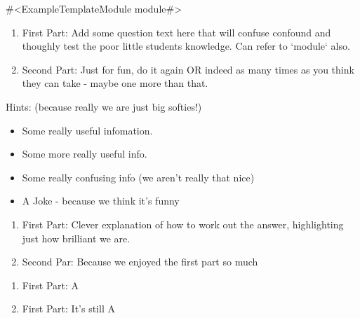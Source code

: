 

#<ExampleTemplateModule module#>
\begin{enumerate}
\item   First Part:
        Add some question text here that will confuse 
        confound and thoughly test the poor little students
        knowledge. Can refer to `module` also.
\item   Second Part:
        Just for fun, do it again OR indeed as many times
        as you think they can take - maybe one more than
        that.
\end{enumerate}
Hints: (because really we are just big softies!)
\begin{itemize}
\item   Some really useful infomation.
\item   Some more really useful info.
\item   Some really confusing info (we aren't really that nice)
\item   A Joke - because we think it's funny
\end{itemize}
\begin{enumerate}
\item   First Part:
        Clever explanation of how to work out the answer,
        highlighting just how brilliant we are.
\item   Second Par:
        Because we enjoyed the first part so much
\end{enumerate}
\begin{enumerate}
\item   First Part: A
\item   First Part: It's still A
\end{enumerate}

